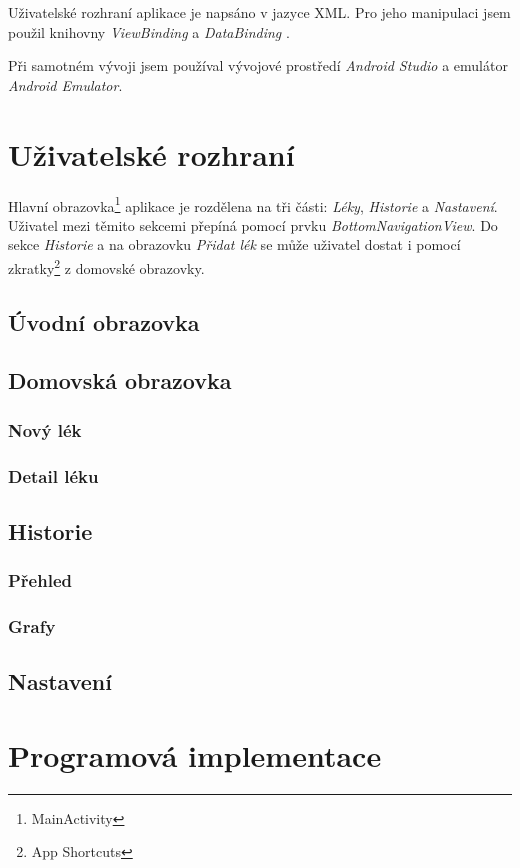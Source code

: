 \documentclass[a4paper,12pt]{report}
\begin{document}
Uživatelské rozhraní aplikace je napsáno v jazyce XML. Pro jeho manipulaci jsem použil knihovny \emph{ViewBinding} \cite{viewbinding} a \emph{DataBinding} \cite{databinding}.

Při samotném vývoji jsem používal vývojové prostředí \emph{Android Studio} \cite{studio} a emulátor \emph{Android Emulator}.

\section{Uživatelské rozhraní}

Hlavní obrazovka\footnote{MainActivity} aplikace je rozdělena na tři části: \emph{Léky}, \emph{Historie} a \emph{Nastavení}. Uživatel mezi těmito sekcemi přepíná pomocí prvku \emph{BottomNavigationView}. Do sekce \emph{Historie} a na obrazovku \emph{Přidat lék} se může uživatel dostat i pomocí zkratky\footnote{App Shortcuts} z domovské obrazovky.

\subsection{Úvodní obrazovka}
\subsection{Domovská obrazovka}
\subsubsection{Nový lék}
\subsubsection{Detail léku}
\subsection{Historie}
\subsubsection{Přehled}
\subsubsection{Grafy}
\subsection{Nastavení}
\section{Programová implementace}
\end{document}
